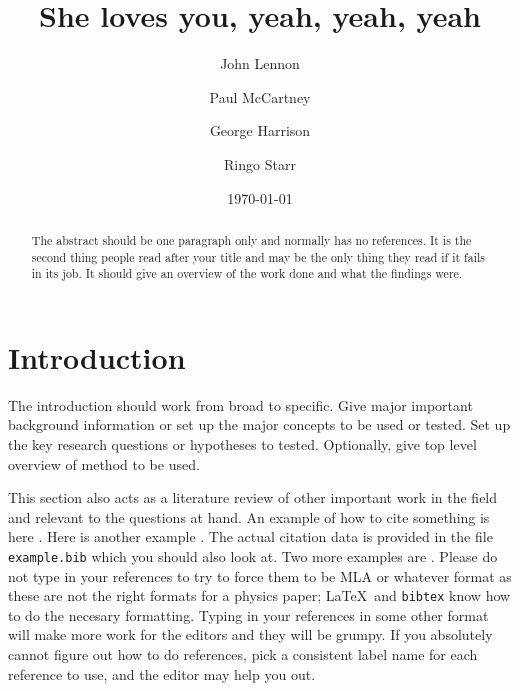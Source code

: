 \documentclass[amsmath,amssymb,aps,endfloats,linenumbers]{revtex4-2}
\begin{document}

\title{She loves you, yeah, yeah, yeah}
\author{John Lennon}
\author{Paul McCartney}
\author{George Harrison}
\author{Ringo Starr}
\date{\today}


\begin{abstract}
The abstract should be one paragraph only and normally has no references. It is the second thing people read after your title and may be the only thing they read if it fails in its job. It should give an overview of the work done and what the findings were. 

\end{abstract}


\maketitle\thispagestyle{mytitlepage}


\section{Introduction}
The introduction should work from broad to specific. Give major important background information or set up the major concepts to be used or tested. Set up the key research questions or hypotheses to tested. Optionally, give top level overview of method to be used. 

This section also acts as a literature review of other important work in the field and relevant to the questions at hand. An example of how to cite something is here \cite{tipler}. Here is another example \cite{openstax}. The actual citation data is provided in the file \texttt{example.bib} which you should also look at. Two more examples are \cite{rombauer:1931:joy, binzel:1988:hemispherical}. Please do not type in your references to try to force them to be MLA or whatever format as these are not the right formats for a physics paper; \LaTeX\ and \texttt{bibtex} know how to do the necesary formatting. Typing in your references in some other format will make more work for the editors and they will be grumpy. If you absolutely cannot figure out how to do references, pick a consistent label name for each reference to use, and the editor may help you out. 
\end{document}
